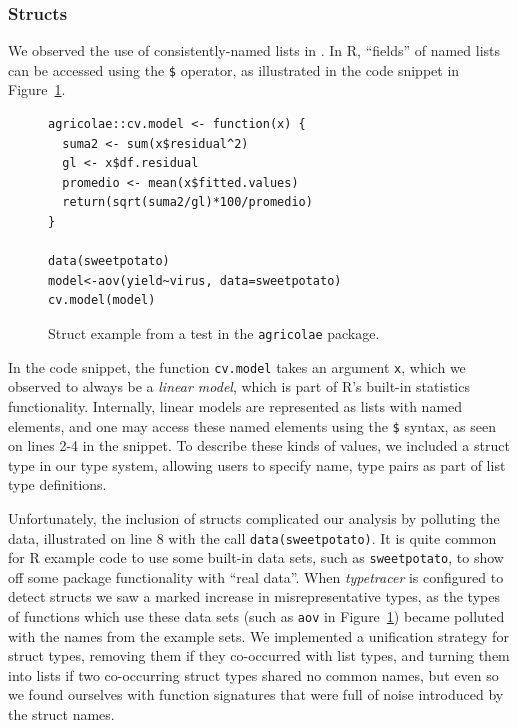 \documentclass[acmsmall,review,anonymous]{acmart}\settopmatter{printfolios=true,printccs=false,printacmref=false}
\newcommand{\code}[1]{{\lstinline[style=Rin]!#1!}\xspace}
\newcommand{\typetracer}{\emph{typetracer}\xspace} %
\begin{document}
%
%
\subsubsection{Structs}
\label{subsec:structs}


We observed the use of consistently-named lists in .  In R, ``fields'' of named lists can be accessed using the
\code{$} operator, as illustrated in the code snippet in
Figure~\ref{fig:struct-ex}.

\begin{figure}[htbp]
\begin{center}

\begin{lstlisting}
agricolae::cv.model <- function(x) {
  suma2 <- sum(x$residual^2)
  gl <- x$df.residual
  promedio <- mean(x$fitted.values)
  return(sqrt(suma2/gl)*100/promedio)
}

data(sweetpotato)
model<-aov(yield~virus, data=sweetpotato)
cv.model(model)
\end{lstlisting}

\caption{Struct example from a test in the \code{agricolae} package.}
\label{fig:struct-ex}
\end{center}
\end{figure}

In the code snippet, the function \code{cv.model} takes an argument
\code{x}, which we observed to always be a {\it linear model}, which is part
of R's built-in statistics functionality.  Internally, linear models are
represented as lists with named elements, and one may access these named
elements using the \code{$} syntax, as seen on lines 2-4 in the snippet.  To
describe these kinds of values, we included a struct type in our type
system, allowing users to specify name, type pairs as part of list type
definitions.

Unfortunately, the inclusion of structs complicated our analysis by
polluting the data, illustrated on line 8 with the call
\code{data(sweetpotato)}.  It is quite common for R example code to use some
built-in data sets, such as \code{sweetpotato}, to show off some package
functionality with ``real data''.  When \typetracer is configured to detect
structs we saw a marked increase in misrepresentative types, as the types of
functions which use these data sets (such as \code{aov} in
Figure~\ref{fig:struct-ex}) became polluted with the names from the example
sets.  We implemented a unification strategy for struct types, removing them
if they co-occurred with list types, and turning them into lists if two
co-occurring struct types shared no common names, but even so we found
ourselves with function signatures that were full of noise introduced by the
struct names.
\end{document}
